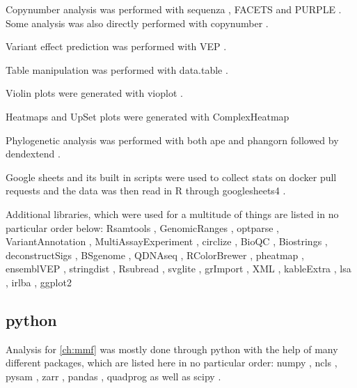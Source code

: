{Copynumber analysis was performed with sequenza \cite{Favero2015}, FACETS \cite{Shen2016,Seshan2018} and PURPLE \cite{Cameron2019a}. Some analysis was also directly performed with copynumber \cite{Nilsen2012,Nilsen2021}.

Variant effect prediction was performed with VEP \cite{McLaren2016}.

Table manipulation was performed with data.table \cite{Dowle2021}.

Violin plots were generated with vioplot \cite{Adler2020}.

Heatmaps and UpSet plots were generated with ComplexHeatmap \cite{Gu2016}

Phylogenetic analysis was performed with both ape \cite{Paradis2018} and phangorn \cite{Schliep2017} followed by dendextend \cite{Galili2015}.

Google sheets and its built in scripts were used to collect stats on docker pull requests and the data was then read in R through googlesheets4 \cite{Bryan2021}.

Additional libraries, which were used for a multitude of things are listed in no particular order below: Rsamtools \cite{Morgan2021}, GenomicRanges \cite{Lawrence2013}, optparse \cite{Davis2020}, VariantAnnotation \cite{Obenchain2014}, MultiAssayExperiment \cite{Ramos2017}, circlize \cite{Gu2014}, BioQC \cite{Zhang2017}, Biostrings \cite{Pages2020}, deconstructSigs \cite{Rosenthal2016}, BSgenome \cite{Pages2020a}, QDNAseq \cite{Scheinin2014}, RColorBrewer \cite{Neuwirth2014}, pheatmap \cite{Kolde2019}, ensemblVEP \cite{Obenchain2020}, stringdist \cite{vanderLoo2014}, Rsubread \cite{Liao2019}, svglite \cite{Wickham2021}, grImport \cite{Murrell2009}, XML \cite{TempleLang2020}, kableExtra \cite{Zhu2021}, lsa \cite{Wild2020}, irlba \cite{Baglama2019}, ggplot2 \cite{Wickham2016}


\subsection*{python}
Analysis for \autoref{ch:mmf} was mostly done through python \cite{VanRossum2010} with the help of many different packages, which are listed here in no particular order: numpy \cite{Harris2020}, ncls \cite{Stovner2019}, pysam \cite{Heger2021,Bonfield2021,Danecek2021}, zarr \cite{Miles2021}, pandas \cite{McKinney2010,Reback2021}, quadprog \cite{McGibbon2021} as well as scipy \cite{Virtanen2020}.

}
